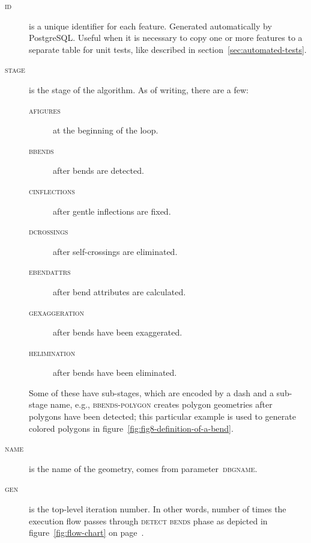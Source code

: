 \documentclass[a4paper]{article}
\newcommand{\onpage}[1]{\ref{#1} on page~\pageref{#1}}
\begin{document}
\begin{description}

    \item[\normalfont\textsc{id}] is a unique identifier for each feature.
        Generated automatically by PostgreSQL. Useful when it is necessary to
        copy one or more features to a separate table for unit tests, like
        described in section~\ref{sec:automated-tests}.

    \item[\normalfont\textsc{stage}] is the stage of the algorithm. As of
        writing, there are a few:
        \begin{description}
            \item[\normalfont\textsc{afigures}] at the beginning of the loop.
            \item[\normalfont\textsc{bbends}] after bends are detected.

            \item[\normalfont\textsc{cinflections}] after gentle inflections
                are fixed.

            \item[\normalfont\textsc{dcrossings}] after self-crossings are
                eliminated.

            \item[\normalfont\textsc{ebendattrs}] after bend attributes are
                calculated.

            \item[\normalfont\textsc{gexaggeration}] after bends have been
                exaggerated.

            \item[\normalfont\textsc{helimination}] after bends have been
                eliminated.

        \end{description}

        Some of these have sub-stages, which are encoded by a dash and a
        sub-stage name, e.g., \textsc{bbends-polygon} creates polygon
        geometries after polygons have been detected; this particular example
        is used to generate colored polygons in
        figure~\ref{fig:fig8-definition-of-a-bend}.

    \item[\normalfont\textsc{name}] is the name of the geometry, comes from
        parameter~\textsc{dbgname}.

    \item[\normalfont\textsc{gen}] is the top-level iteration number. In other
        words, number of times the execution flow passes through
        \textsc{detect bends} phase as depicted in
        figure~\onpage{fig:flow-chart}.


\end{description}
\end{document}

